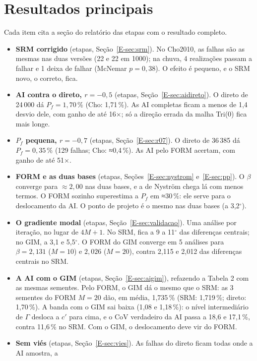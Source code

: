 \documentclass[11pt,a4paper]{article}
\begin{document}
\section{Resultados principais}\label{sec:resultados}
Cada item cita a seção do relatório das etapas com o resultado completo.
\begin{itemize}
  \item \textbf{SRM corrigido} (etapas, Seção~\ref{E-sec:srm}). No Cho2010, as falhas são as mesmas nas duas versões
    (22 e 22 em 1000); na chuva, 4 realizações passam a
    falhar e 1 deixa de falhar (McNemar $p = 0{,}38$). O efeito é pequeno, e o SRM novo, o correto, fica.
  \item \textbf{AI contra o direto, $r = -0{,}5$} (etapas, Seção~\ref{E-sec:aidireto}). O direto de 24\,000 dá $P_f = 1{,}70\,\%$ (Cho: 1,71\,\%). As AI completas ficam a menos de 1{,}4 desvio dele, com ganho de até 16$\times$; só a direção errada da malha Tri(0) fica mais longe.
  \item \textbf{$P_f$ pequena, $r = -0{,}7$} (etapas, Seção~\ref{E-sec:r07}). O direto de 36\,385 dá
    $P_f = 0{,}35\,\%$ (129 falhas; Cho: ≈0,4\,\%). As AI pelo FORM acertam,
    com ganho de até 51$\times$.
  \item \textbf{FORM e as duas bases} (etapas, Seções~\ref{E-sec:nystrom} e~\ref{E-sec:pp}). O $\beta$ converge para
    $\approx 2{,}00$ nas duas bases, e a de Nyström chega lá com menos termos. O FORM sozinho superestima a $P_f$ em
    ≈30\,\%: ele serve para o deslocamento da AI. O ponto de projeto é o mesmo nas duas bases (a 3{,}2$^\circ$).
  \item \textbf{O gradiente modal} (etapas, Seção~\ref{E-sec:validacao}). Uma análise por iteração, no lugar de $4M + 1$.
    No SRM, fica a 9 a 11$^\circ$ das diferenças centrais; no GIM, a 3{,}1 e 5{,}5$^\circ$. O FORM do GIM converge em 5 análises
    para $\beta = 2{,}131$ ($M = 10$) e $2{,}026$ ($M = 20$), contra 2{,}115 e 2{,}012 das diferenças centrais no SRM.
  \item \textbf{A AI com o GIM} (etapas, Seção~\ref{E-sec:aigim}), refazendo a Tabela 2 com as mesmas sementes. Pelo
    FORM, o GIM dá o mesmo que o SRM: as 3 sementes do FORM $M = 20$ dão, em média, 1{,}735\,\% (SRM: 1{,}719\,\%; direto: 1{,}70\,\%). A banda com o GIM sai baixa (1{,}08 e 1{,}18\,\%): o nível intermediário de $\Gamma$ desloca a $c'$ para cima, e o
    CoV verdadeiro da AI passa a 18{,}6 e 17{,}1\,\%, contra 11{,}6\,\% no SRM.
    Com o GIM, o deslocamento deve vir do FORM.
  \item \textbf{Sem viés} (etapas, Seção~\ref{E-sec:vies}). As falhas do direto ficam todas onde a AI amostra, a

\end{itemize}
\end{document}
